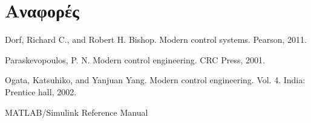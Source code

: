 \documentclass[a4paper,oneside, 10pt]{article}
\begin{document}
\section*{Αναφορές}

\noindent [1] Dorf, Richard C., and Robert H. Bishop. Modern control systems. Pearson, 2011.

\noindent [2] Paraskevopoulos, P. N. Modern control engineering. CRC Press, 2001.

\noindent [3] Ogata, Katsuhiko, and Yanjuan Yang. Modern control engineering. Vol. 4. India: Prentice hall, 2002.

\noindent [4] MATLAB/Simulink Reference Manual
\end{document}
